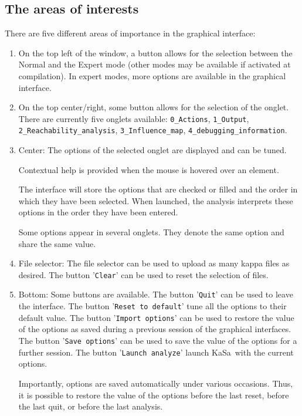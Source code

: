 \documentclass[11pt]{book}
\def\KaSa{\textsf{KaSa}}
\begin{document}
\subsection{The areas of interests} 

There are five different areas of importance in the graphical interface: 
\begin{enumerate}
\item On the top left of the window, a button allows for the selection between the Normal and the Expert mode (other modes may be available if activated at compilation). 
In expert modes, more options are available in the graphical interface.
\item On the top center/right, some button allows for the selection of the onglet. There are currently five onglets available: \texttt{0\_Actions}, \texttt{1\_Output}, \texttt{2\_Reachability\_analysis}, \texttt{3\_Influence\_map}, \texttt{4\_debugging\_information}. 
\item Center: The options of the selected onglet are displayed and can be tuned. 

Contextual help is provided when the mouse is hovered over an element. 

The interface will store the options that are checked or filled and the order in which they have been selected. 
When launched, the analysis interprets these options in the order they have been entered. 

Some options appear in several onglets. They denote the same option and share the same value. 

\item File selector: The file selector can be used to upload as many kappa files as desired. The button '\texttt{Clear}' can be used to reset the selection of files.
\item Bottom: Some buttons are available. The button '\texttt{Quit}' can be used to leave the interface. The button '\texttt{Reset to default}' tune all the options to their default value. The button '\texttt{Import options}' can be used to restore the value of the options as saved during a previous session of the graphical interfaces. The button '\texttt{Save options}' can be used to save the value of the options for a further session. The button '\texttt{Launch analyze}' launch \KaSa\ with the current options. 

Importantly, options are saved automatically under various occasions. Thus, it is possible to restore the value of the options 
before the last reset, before the last quit, or before the last analysis. 
\end{enumerate}
\end{document}
